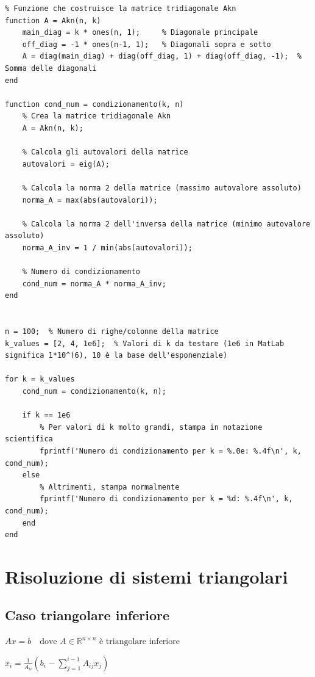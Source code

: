 \documentclass[12pt,a4paper]{article}
\begin{document}
\begin{lstlisting}
% Funzione che costruisce la matrice tridiagonale Akn
function A = Akn(n, k)
    main_diag = k * ones(n, 1);     % Diagonale principale
    off_diag = -1 * ones(n-1, 1);   % Diagonali sopra e sotto
    A = diag(main_diag) + diag(off_diag, 1) + diag(off_diag, -1);  % Somma delle diagonali
end

function cond_num = condizionamento(k, n)
    % Crea la matrice tridiagonale Akn
    A = Akn(n, k);
    
    % Calcola gli autovalori della matrice
    autovalori = eig(A);
    
    % Calcola la norma 2 della matrice (massimo autovalore assoluto)
    norma_A = max(abs(autovalori));
    
    % Calcola la norma 2 dell'inversa della matrice (minimo autovalore assoluto)
    norma_A_inv = 1 / min(abs(autovalori));
    
    % Numero di condizionamento
    cond_num = norma_A * norma_A_inv;
end


n = 100;  % Numero di righe/colonne della matrice
k_values = [2, 4, 1e6];  % Valori di k da testare (1e6 in MatLab significa 1*10^(6), 10 è la base dell'esponenziale)

for k = k_values
    cond_num = condizionamento(k, n);
    
    if k == 1e6
        % Per valori di k molto grandi, stampa in notazione scientifica
        fprintf('Numero di condizionamento per k = %.0e: %.4f\n', k, cond_num);
    else
        % Altrimenti, stampa normalmente
        fprintf('Numero di condizionamento per k = %d: %.4f\n', k, cond_num);
    end
end
\end{lstlisting}
\newpage
\section*{Risoluzione di sistemi triangolari}

\subsection*{Caso triangolare inferiore}

\begin{flushleft}
$A x = b \quad \text{dove } A \in \mathbb{R}^{n \times n} \text{ è triangolare inferiore}$

\vspace{0.5em}

$\displaystyle
x_i = \frac{1}{A_{ii}} \left(b_i - \sum_{j=1}^{i-1} A_{ij} x_j \right)
$
\end{flushleft}
\end{document}

